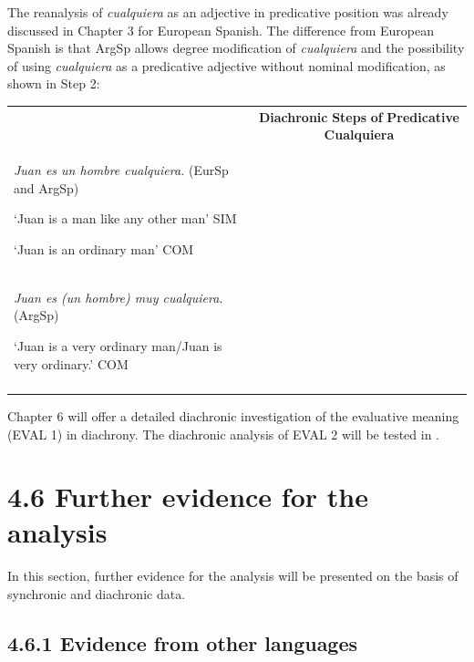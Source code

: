   The reanalysis of \textit{cualquiera} as an adjective in predicative position was already discussed in Chapter 3 for European Spanish. The difference from European Spanish is that ArgSp allows degree modification of \textit{cualquiera} and the possibility of using \textit{cualquiera} as a predicative adjective without nominal modification, as shown in Step 2:

\begin{table}
\begin{tabularx}{\textwidth}{XXX}
\lsptoprule

& \multicolumn{2}{c}{ \textbf{Diachronic} \textbf{Steps} \textbf{of} \textbf{Predicative \textbf{Cualquiera}}}\\

 \textit{Juan es un hombre cualquiera.} (EurSp and ArgSp)

‘Juan is a man like any other man’ SIM

‘Juan is an ordinary man’ COM\\

\textit{Juan es (un hombre) muy cualquiera.} (ArgSp)

‘Juan is a very ordinary man/Juan is very ordinary.’ COM\\
\lspbottomrule
\end{tabularx}
\end{table}

Chapter 6 will offer a detailed diachronic investigation of the evaluative meaning (EVAL 1) in diachrony. The diachronic analysis of EVAL 2 will be tested in . 

\section{\textbf{4.6} \textbf{Further} \textbf{evidence} \textbf{for} \textbf{the} \textbf{analysis}}

In this section, further evidence for the analysis will be presented on the basis of synchronic and diachronic data.

\subsection{\textbf{4.6.1} \textbf{Evidence} \textbf{from} \textbf{other} \textbf{languages}}

